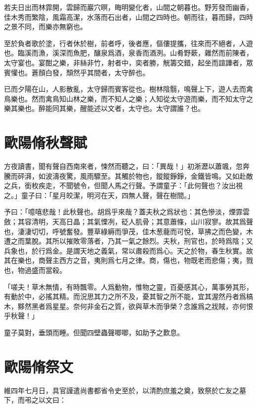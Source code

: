 若夫日出而林霏開，雲歸而巖穴暝，晦明變化者，山間之朝暮也。野芳發而幽香，佳木秀而繁陰，風霜高潔，水落而石出者，山間之四時也。朝而往，暮而歸，四時之景不同，而樂亦無窮也。

至於負者歌於塗，行者休於樹，前者呼，後者應，傴僂提攜，往來而不絕者，人遊也。臨溪而漁，溪深而魚肥，釀泉爲酒，泉香而酒洌。山肴野蔌，雜然而前陳者，太守宴也。宴酣之樂，非絲非竹，射者中，奕者勝，觥籌交錯，{起坐}而諠譁者，眾賓懽也。蒼顏白發，頹然乎其間者，太守醉也。%

已而夕陽在山，人影散亂，太守歸而賓客從也。樹林陰翳，鳴聲上下，遊人去而禽鳥樂也。然而禽鳥知山林之樂，而不知人之樂；人知從太守遊而樂，而不知太守之樂其樂也。醉能同其樂，醒能述以文者，太守也。太守謂誰？也。

\section[秋聲賦\quad{\small 歐陽脩}]{{\normalsize 歐陽脩}\quad 秋聲賦}
方夜讀書，聞有聲自西南來者，悚然而聽之，曰：「異哉！」初淅瀝以蕭颯，忽奔騰而砰湃，如波濤夜驚，風雨驟至。其觸於物也，鏦鏦錚錚，金鐵皆鳴。又如赴敵之兵，銜枚疾走，不聞號令，但聞人馬之行聲。予謂童子：「此何聲也？汝出視之。」童子曰：「星月皎潔，明河在天，四無人聲，聲在樹間。」

予曰：「噫嘻悲哉！此秋聲也。胡爲{乎}來哉？蓋夫秋之爲狀也：其色慘淡，煙霏雲斂；其容清明，天高日晶；其氣慄冽，砭人肌骨；其意蕭條，山川寂寥。故其爲聲也，淒淒切切，呼號奮發。豐草綠縟而爭茂，佳木葱蘢而可悅，草拂之而色變，木遭之而葉脫。其所以摧敗零落者，乃其一氣之餘烈。夫秋，刑官也，於時爲陰；又兵象也，於行爲金。是謂天地之義氣，常以肅殺而爲心。天之於物，春生秋實。故其在樂也，商聲主西方之音，夷則爲七月之律。商，傷也，物既老而悲傷；夷，戮也，物過盛而當殺。%

「嗟夫！草木無情，有時飄零。人爲動物，惟物之靈，百憂感其心，萬事勞其形，有動於中，必搖其精。而況思其力之所不及，憂其智之所不能，宜其渥然丹者爲槁木，黟然黑者爲星星。奈何非金石之質，欲與草木而爭榮？念誰爲之戕賊，亦何恨乎秋聲！」

童子莫對，垂頭而睡。但聞四壁蟲聲唧唧，如助予之歎息。

\theendnotes

\section[祭石曼卿文\quad{\small 歐陽脩}]{{\normalsize 歐陽脩}\quad 祭文}
維四年七月日，具官謹遣尚書都省令史至於，以清酌庶羞之奠，致祭於亡友之墓下，而弔之以文曰：

